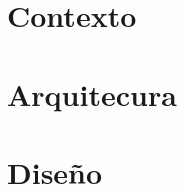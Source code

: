 \documentclass[11pt,fleqn]{book} %
\begin{document}
	\pagestyle{empty} %
	
	\tableofcontents %
	
	\cleardoublepage %
	
	\pagestyle{fancy} %
	
	
	\part{Contexto}
	
	
	
	
	\part{Arquitecura}
	
	
	
	
	
	
	
	
	\part{Diseño}
%	
%	
%	
%	
%	
%	
%	
%	
	
	
%	
%	
%	
%	
	
\backmatter



%
\end{document}

